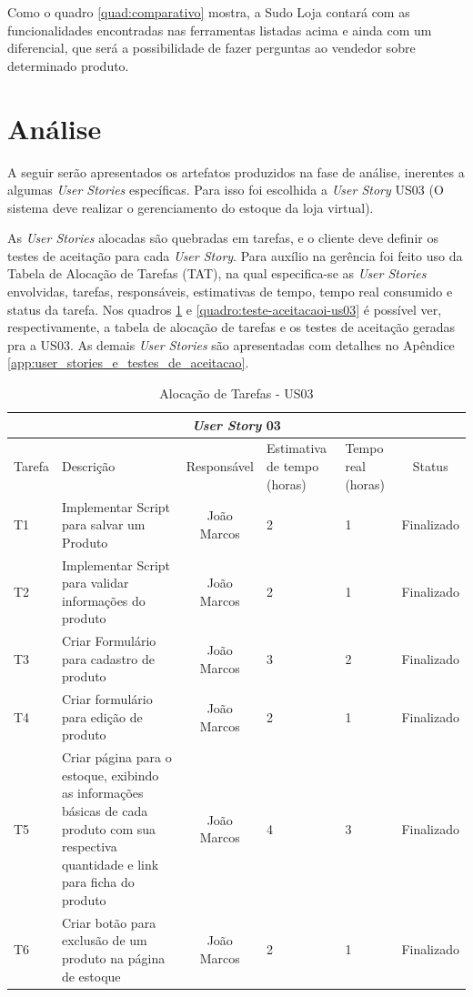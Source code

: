 \documentclass[a4paper,12pt]{monografia}
\begin{document}
Como o quadro \ref{quad:comparativo} mostra, a Sudo Loja contará com as funcionalidades encontradas nas ferramentas listadas acima e ainda com um diferencial, que será a possibilidade de fazer perguntas ao vendedor sobre determinado produto.


\section{Análise} %
\label{sec:analise}

A seguir serão apresentados os artefatos produzidos na fase de análise, inerentes a algumas \textit{User Stories} específicas. Para isso foi escolhida a \textit{User Story} US03 (O sistema deve realizar o gerenciamento do estoque da loja virtual).

As \textit{User Stories} alocadas são quebradas em tarefas, e o cliente deve definir os testes de aceitação para cada \textit{User Story}. Para auxílio na gerência foi feito uso da Tabela de Alocação de Tarefas (TAT), na qual especifica-se as \textit{\textit{User Stories}} envolvidas, tarefas, responsáveis, estimativas de tempo, tempo real consumido e status da tarefa. Nos quadros \ref{quadro:tati-us03} e \ref{quadro:teste-aceitacaoi-us03} é possível ver, respectivamente, a tabela de alocação de tarefas e os testes de aceitação geradas pra a US03. As demais \textit{\textit{User Stories}} são apresentadas com detalhes no Apêndice \ref{app:user_stories_e_testes_de_aceitacao}.	

\newpage

\begin{longtable}{|p{1.5cm}|p{3.5cm}|c|p{2cm}|p{2cm}|c|}
\caption{Alocação de Tarefas - US03}
\label{quadro:tati-us03}
\hline
\multicolumn{6}{|c|}{\textbf{\textit{User Story} 03}}\\
\hline		
\rowcolor{ballblue}
Tarefa & Descrição & Responsável & Estimativa de tempo (horas) & Tempo real (horas) & Status\\
\hline
T1 & Implementar Script para salvar um Produto & João Marcos & 2 & 1 & Finalizado\\
\hline
T2 & Implementar Script para validar informações do produto & João Marcos & 2 & 1 & Finalizado\\
\hline
T3 & Criar Formulário para cadastro de produto & João Marcos & 3 & 2 & Finalizado\\
\hline
T4 & Criar formulário para edição de produto & João Marcos & 2 & 1 & Finalizado\\
\hline
T5 & Criar página para o estoque, exibindo as informações básicas de cada produto com sua respectiva quantidade e link para ficha do produto & João Marcos & 4 & 3 & Finalizado\\
\hline
T6 & Criar botão para exclusão de um produto na página de estoque & João Marcos & 2 & 1 & Finalizado\\
\hline
\end{longtable}
\end{document}
